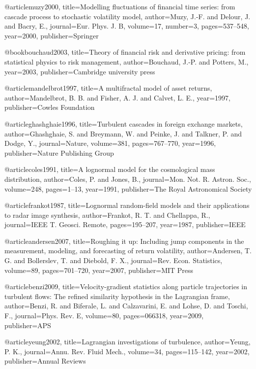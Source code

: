 @article{muzy2000,
  title={Modelling fluctuations of financial time series: from cascade process to stochastic volatility model},
  author={Muzy, J.-F. and Delour, J. and Bacry, E.},
  journal={Eur. Phys. J. B},
  volume={17},
  number={3},
  pages={537--548},
  year={2000},
  publisher={Springer}
}

@book{bouchaud2003,
  title={Theory of financial risk and derivative pricing: from statistical physics to risk management},
  author={Bouchaud, J.-P. and Potters, M.},
  year={2003},
  publisher={Cambridge university press}
}

@article{mandelbrot1997,
  title={A multifractal model of asset returns},
  author={Mandelbrot, B. B. and Fisher, A. J. and Calvet, L. E.},
  year={1997},
  publisher={Cowles Foundation}
}

@article{ghashghaie1996,
  title={Turbulent cascades in foreign exchange markets},
  author={Ghashghaie, S. and Breymann, W. and Peinke, J. and Talkner, P. and Dodge, Y.},
  journal={Nature},
  volume={381},
  pages={767--770},
  year={1996},
  publisher={Nature Publishing Group}
}

@article{coles1991,
  title={A lognormal model for the cosmological mass distribution},
  author={Coles, P. and Jones, B.},
  journal={Mon. Not. R. Astron. Soc.},
  volume={248},
  pages={1--13},
  year={1991},
  publisher={The Royal Astronomical Society}
}

@article{frankot1987, 
  title={Lognormal random-field models and their applications to radar image synthesis},
  author={Frankot, R. T. and Chellappa, R.},
  journal={IEEE T. Geosci. Remote},
  pages={195--207},
  year={1987},
  publisher={IEEE}
}

@article{andersen2007,
  title={{Roughing it up: Including jump components in the measurement, modeling, and forecasting of return volatility}},
  author={Andersen, T. G. and Bollerslev, T. and Diebold, F. X.},
  journal={Rev. Econ. Statistics},
  volume={89},
  pages={701--720},
  year={2007},
  publisher={MIT Press}
}

@article{benzi2009,
  title={{Velocity-gradient statistics along particle trajectories in turbulent flows: The refined similarity hypothesis in the Lagrangian frame}},
  author={Benzi, R. and Biferale, L. and Calzavarini, E. and Lohse, D. and Toschi, F.},
  journal={Phys. Rev. E},
  volume={80},
  pages={066318},
  year={2009},
  publisher={APS}
}

@article{yeung2002,
  title={Lagrangian investigations of turbulence},
  author={Yeung, P. K.},
  journal={Annu. Rev. Fluid Mech.},
  volume={34},
  pages={115--142},
  year={2002},
  publisher={Annual Reviews}
}

